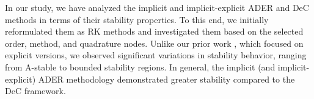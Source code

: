 
In our study, we have analyzed the implicit and implicit-explicit ADER and DeC methods in terms of their stability properties. To this end, we initially reformulated them as RK methods and investigated them based on the selected order, method, and quadrature nodes. Unlike our prior work \cite{Han_Veiga_2021}, which focused on explicit versions, we observed significant variations in stability behavior, ranging from A-stable to bounded stability regions. In general, the implicit (and implicit-explicit) ADER methodology demonstrated greater stability compared to the DeC framework.

